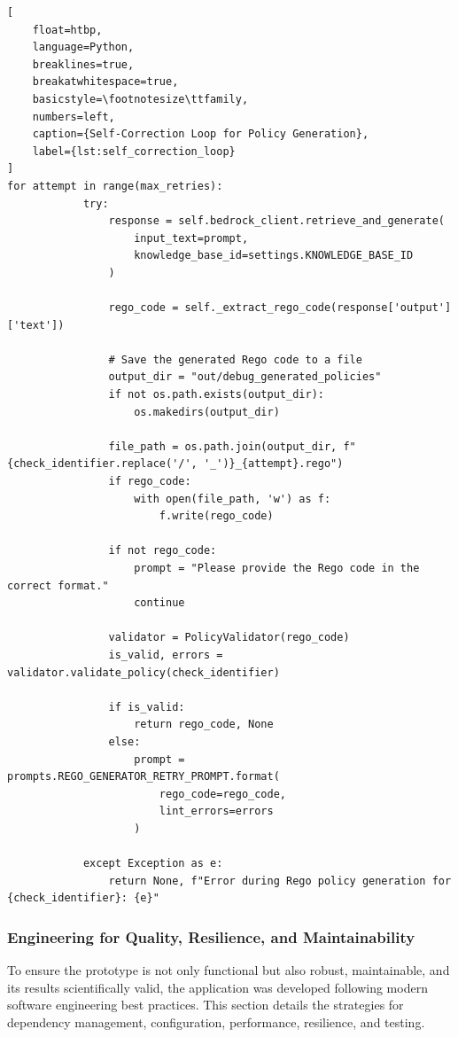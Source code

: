 \begin{lstlisting}[
    float=htbp,
    language=Python, 
    breaklines=true, 
    breakatwhitespace=true,
    basicstyle=\footnotesize\ttfamily, 
    numbers=left,
    caption={Self-Correction Loop for Policy Generation},
    label={lst:self_correction_loop}
]
for attempt in range(max_retries):
            try:
                response = self.bedrock_client.retrieve_and_generate(
                    input_text=prompt,
                    knowledge_base_id=settings.KNOWLEDGE_BASE_ID
                )

                rego_code = self._extract_rego_code(response['output']['text'])

                # Save the generated Rego code to a file
                output_dir = "out/debug_generated_policies"
                if not os.path.exists(output_dir):
                    os.makedirs(output_dir)
                
                file_path = os.path.join(output_dir, f"{check_identifier.replace('/', '_')}_{attempt}.rego")
                if rego_code:
                    with open(file_path, 'w') as f:
                        f.write(rego_code)

                if not rego_code:
                    prompt = "Please provide the Rego code in the correct format."
                    continue

                validator = PolicyValidator(rego_code)
                is_valid, errors = validator.validate_policy(check_identifier)

                if is_valid:
                    return rego_code, None
                else:
                    prompt = prompts.REGO_GENERATOR_RETRY_PROMPT.format(
                        rego_code=rego_code,
                        lint_errors=errors
                    )

            except Exception as e:
                return None, f"Error during Rego policy generation for {check_identifier}: {e}"
\end{lstlisting}

\subsubsection{Engineering for Quality, Resilience, and Maintainability}

To ensure the prototype is not only functional but also robust, maintainable, and its results scientifically valid, the application was developed following modern software engineering best practices. This section details the strategies for dependency management, configuration, performance, resilience, and testing.

